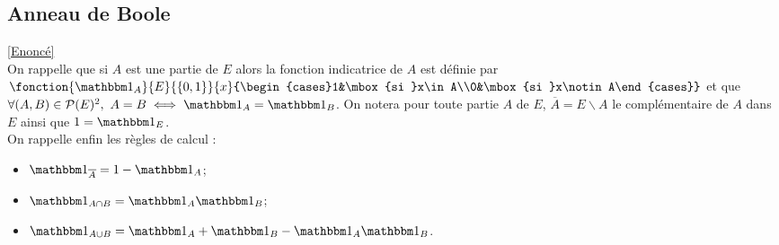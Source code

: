 \documentclass[8pt]{book}
\begin{document}
	\subsection{Anneau de Boole }
	\label{Anneau de Boole corrigé}
	\textcolor{blue}{\hyperref[Anneau de Boole]{[Enoncé]}}\\
	On rappelle que si $A$ est une partie de $E$ alors la fonction indicatrice de $A$ est définie par $\fonction{\mathbbm 1_A}{E}{\{0,1\}}{x}{\begin{cases}1&\mbox{si }x\in A\\0&\mbox{si }x\notin A\end{cases}}$ et que $\forall (A,B)\in \mathcal P(E)^2,\ A=B\iff \mathbbm 1_A=\mathbbm 1_B$. On notera pour toute partie $A$ de $E$, $\overline A=E\backslash A$ le complémentaire de $A$ dans $E$ ainsi que $1=\mathbbm 1_E$.\\
	On rappelle enfin les règles de calcul :
	\begin{itemize}
		\item $\mathbbm 1_{\overline A}=1-\mathbbm 1_A$;
		\item $\mathbbm 1_{A\cap B}=\mathbbm 1_A\mathbbm 1_B$;
		\item $\mathbbm 1_{A\cup B}=\mathbbm 1_A+\mathbbm 1_B-\mathbbm 1_A\mathbbm 1_B$.
	\end{itemize}
\end{document}
